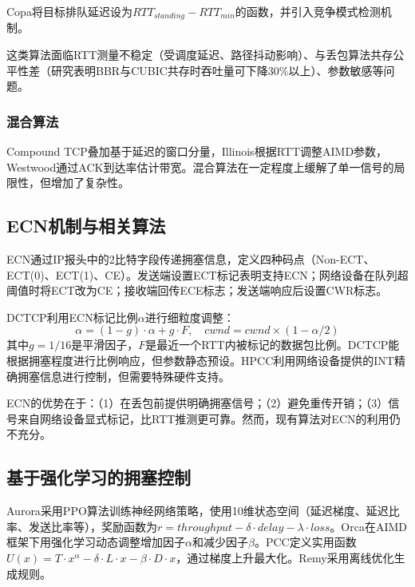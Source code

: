 \documentclass[10pt,twocolumn]{article}
\begin{document}
Copa\cite{copa}将目标排队延迟设为$RTT_{standing} - RTT_{min}$的函数，并引入竞争模式检测机制。

这类算法面临RTT测量不稳定（受调度延迟、路径抖动影响）、与丢包算法共存公平性差（研究表明BBR与CUBIC共存时吞吐量可下降30\%以上\cite{bbrfairness}）、参数敏感等问题。

\subsubsection{混合算法}

Compound TCP\cite{compound}叠加基于延迟的窗口分量，Illinois\cite{illinois}根据RTT调整AIMD参数，Westwood\cite{westwood}通过ACK到达率估计带宽。混合算法在一定程度上缓解了单一信号的局限性，但增加了复杂性。

\subsection{ECN机制与相关算法}

ECN\cite{rfc3168}通过IP报头中的2比特字段传递拥塞信息，定义四种码点（Non-ECT、ECT(0)、ECT(1)、CE）。发送端设置ECT标记表明支持ECN；网络设备在队列超阈值时将ECT改为CE；接收端回传ECE标志；发送端响应后设置CWR标志。

DCTCP\cite{dctcp}利用ECN标记比例$\alpha$进行细粒度调整：
\begin{equation}
\alpha = (1-g) \cdot \alpha + g \cdot F, \quad cwnd = cwnd \times (1 - \alpha/2)
\end{equation}
其中$g=1/16$是平滑因子，$F$是最近一个RTT内被标记的数据包比例。DCTCP能根据拥塞程度进行比例响应，但参数静态预设。HPCC\cite{hpcc}利用网络设备提供的INT精确拥塞信息进行控制，但需要特殊硬件支持。

ECN的优势在于：（1）在丢包前提供明确拥塞信号；（2）避免重传开销；（3）信号来自网络设备显式标记，比RTT推测更可靠。然而，现有算法对ECN的利用仍不充分。

\subsection{基于强化学习的拥塞控制}

Aurora\cite{aurora}采用PPO算法训练神经网络策略，使用10维状态空间（延迟梯度、延迟比率、发送比率等），奖励函数为$r = throughput - \delta \cdot delay - \lambda \cdot loss$。Orca\cite{orca}在AIMD框架下用强化学习动态调整增加因子$\alpha$和减少因子$\beta$。PCC\cite{pcc}定义实用函数$U(x) = T \cdot x^\alpha - \delta \cdot L \cdot x - \beta \cdot D \cdot x$，通过梯度上升最大化。Remy\cite{remy}采用离线优化生成规则。
\end{document}
